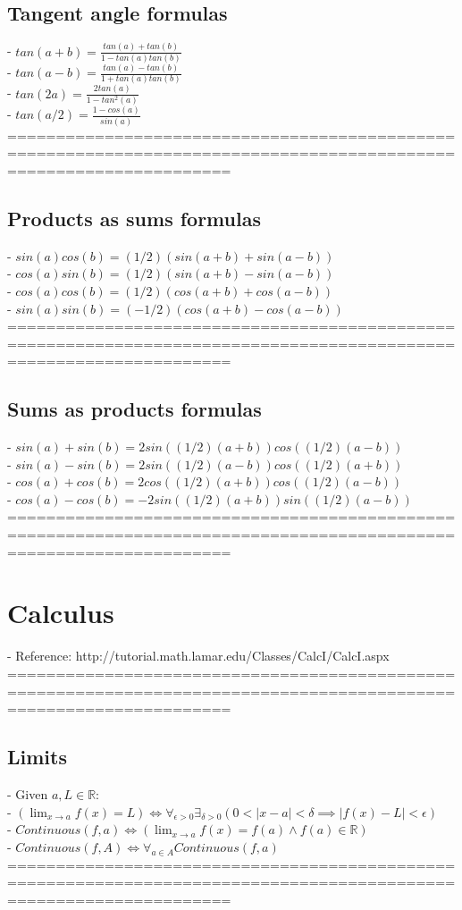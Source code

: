 \documentclass{book}
\begin{document}
\section{Tangent angle formulas}
	- $tan(a+b) = \frac{tan(a) + tan(b)}{1 - tan(a) tan(b)}$ \\
	- $tan(a-b) = \frac{tan(a) - tan(b)}{1 + tan(a) tan(b)}$ \\
	- $tan(2a) = \frac{2 tan(a)}{1 - tan^2(a)}$ \\
	- $tan(a/2) = \frac{1 - cos(a)}{sin(a)}$ \\
	===================================================================================================================
\section{Products as sums formulas}
	- $sin(a) cos(b) = (1/2) (sin(a+b) + sin(a-b))$ \\
	- $cos(a) sin(b) = (1/2) (sin(a+b) - sin(a-b))$ \\
	- $cos(a) cos(b) = (1/2) (cos(a+b) + cos(a-b))$ \\
	- $sin(a) sin(b) = (-1/2) (cos(a+b) - cos(a-b))$ \\
	===================================================================================================================
\section{Sums as products formulas}
	- $sin(a) + sin(b) = 2 sin((1/2) (a + b)) cos((1/2) (a - b))$ \\
	- $sin(a) - sin(b) = 2 sin((1/2) (a - b)) cos((1/2) (a + b))$ \\
	- $cos(a) + cos(b) = 2 cos((1/2) (a + b)) cos((1/2) (a - b))$ \\
	- $cos(a) - cos(b) = -2 sin((1/2) (a + b)) sin((1/2) (a - b))$ \\
	===================================================================================================================

\chapter{Calculus}
	- Reference: http://tutorial.math.lamar.edu/Classes/CalcI/CalcI.aspx \\
	===================================================================================================================
\section{Limits}
	- Given $a, L \in \mathbb{R}$: \\
	- $(\lim_{x \to a} f(x) = L) \iff \forall_{\epsilon > 0} \exists_{\delta > 0} (0 < |x - a| < \delta \implies |f(x) - L| < \epsilon)$ \\
	- $Continuous(f, a) \iff (\lim_{x \to a} f(x) = f(a) \land f(a) \in \mathbb{R})$ \\
	- $Continuous(f, A) \iff \forall_{a \in A} Continuous(f, a)$ \\
	===================================================================================================================
\end{document}
